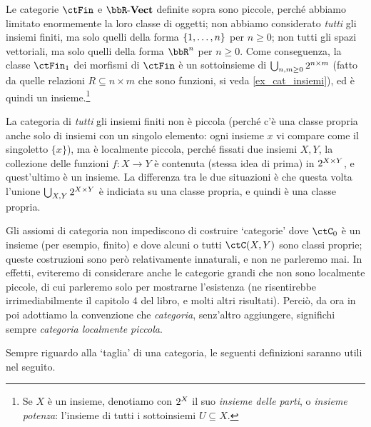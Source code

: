 Le categorie \(\ctFin\) e \(\ctVect[\bbR]\) definite sopra sono piccole, perché abbiamo limitato enormemente la loro classe di oggetti; non abbiamo considerato \emph{tutti} gli insiemi finiti, ma solo quelli della forma \(\{\iter n\}\) per \(n\ge 0\); non tutti gli spazi vettoriali, ma solo quelli della forma \(\bbR^n\) per \(n\ge 0\). Come conseguenza, la classe \(\ctFin_1\) dei morfismi di \(\ctFin\) è un sottoinsieme di
\(\bigcup_{n,m\ge 0}2^{n\times m}\)
(fatto da quelle relazioni \(R\subseteq n\times m\) che sono funzioni, si veda \ref{ex_cat_insiemi}), ed è quindi un insieme.\footnote{Se \(X\) è un insieme, denotiamo con \(2^{X}\) il suo \emph{insieme delle parti}, o \emph{insieme potenza}: l'insieme di tutti i sottoinsiemi \(U\subseteq X\).}

La categoria di \emph{tutti} gli insiemi finiti non è piccola (perché c'è una classe propria anche solo di insiemi con un singolo elemento: ogni insieme \(x\) vi compare come il singoletto \(\{x\}\)), ma è localmente piccola, perché fissati due insiemi \(X,Y\), la collezione delle funzioni \(f : X\to Y\) è contenuta (stessa idea di prima) in \(2^{X\times Y}\), e quest'ultimo è un insieme. La differenza tra le due situazioni è che questa volta l'unione \(\bigcup_{X,Y}2^{X\times Y}\) è indiciata su una classe propria, e quindi è una classe propria.
\begin{remark}
	Gli assiomi di categoria non impediscono di costruire `categorie' dove \(\ctC_0\) è un insieme (per esempio, finito) e dove alcuni o tutti \(\Hom{\ctC}(X,Y)\) sono classi proprie; queste costruzioni sono però relativamente innaturali, e non ne parleremo mai. In effetti, eviteremo di considerare anche le categorie grandi che non sono localmente piccole, di cui parleremo solo per mostrarne l'esistenza (ne risentirebbe irrimediabilmente il capitolo 4 del libro, e molti altri risultati). Perciò, da ora in poi adottiamo la convenzione che \emph{categoria}, senz'altro aggiungere, significhi sempre \emph{categoria localmente piccola}.
\end{remark}
Sempre riguardo alla `taglia' di una categoria, le seguenti definizioni saranno utili nel seguito.
